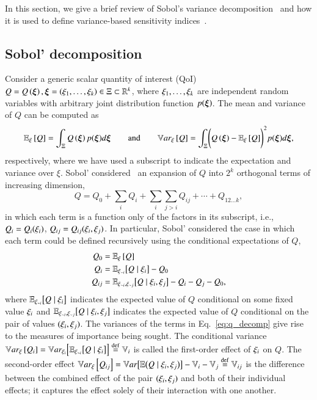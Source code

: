 In this section, we give a brief review of Sobol's variance decomposition~\cite{sobol-1993} and how it is used to define variance-based sensitivity indices~\cite{sobol-1993, homma-saltelli-1996}.

\subsection{Sobol' decomposition}
Consider a generic scalar quantity of interest (QoI) $Q = Q\left( \bm{\xi} \right), \bm{\xi} = \left( \xi_1,\ldots,\xi_k \right) \in \Xi \subset \mathbb{R}^k$, where $\xi_1,\ldots,\xi_k$ are independent random variables with arbitrary joint distribution function $p(\bm{\xi})$. 
The mean and variance of $Q$ can be computed as
\begin{equation}
    \mathbb{E}_\xi\left[Q\right] = \int_{\Xi} Q\left( \bm{\xi} \right) p(\bm{\xi}) d\bm{\xi} \qquad \text{and} \qquad \mathbb{V}ar_{\xi}\left[Q\right] = \int_{\Xi} \Biggl( Q\left( \bm{\xi} \right) - \mathbb{E}_\xi\left[Q\right] \Biggr)^2 p(\bm{\xi}) d\bm{\xi} ,
\end{equation}
respectively, where we have used a subscript to indicate the expectation and variance over $\xi$. 
Sobol' considered~\cite{sobol-1993} an expansion of $Q$ into $2^k$ orthogonal terms of increasing dimension, 
\begin{equation} \label{eq:q_decomp}
    Q = Q_0 + \sum_i Q_i + \sum_i \sum_{j > i} Q_{ij} + \cdots + Q_{12 \ldots k} ,
\end{equation}
in which each term is a function only of the factors in its subscript, i.e., $Q_i = Q_i(\xi_{i})$, $Q_{ij} = Q_{ij}(\xi_{i}, \xi_{j})$.
In particular, Sobol' considered the case in which each term could be defined recursively using the conditional expectations of $Q$,
\begin{align}
    Q_0 &= \mathbb{E}_\xi\left[Q\right] \\
    Q_i &= \mathbb{E}_{\xi_{\sim i}} \bigl[ Q \mid \xi_{i} \bigr] - Q_0 \\
    Q_{ij} &= \mathbb{E}_{\xi_{\sim i},\xi_{\sim j}} \bigl[ Q \mid \xi_{i}, \xi_{j} \bigr] - Q_i - Q_j - Q_0 ,
\end{align}
where $\mathbb{E}_{\xi_{\sim i}} \bigl[ Q \mid \xi_{i} \bigr]$ indicates the expected value of $Q$ conditional on some fixed value $\xi_{i}$ and $\mathbb{E}_{\xi_{\sim i},\xi_{\sim j}} \bigl[ Q \mid \xi_{i}, \xi_{j} \bigr]$ indicates the expected value of $Q$ conditional on the pair of values $(\xi_{i}, \xi_{j})$. 
The variances of the terms in Eq.~\eqref{eq:q_decomp} give rise to the measures of importance being sought. 
The conditional variance $\mathbb{V}ar_{\xi}\left[Q_i\right] = \mathbb{V}ar_{\xi_{i}} \Bigl[ \mathbb{E}_{\xi_{\sim i}}\bigl[ Q \mid \xi_{i} \bigr] \Bigr] \overset{\operatorname{def}}{=} \mathbb{V}_{i}$ is called the first-order effect of $\xi_{i}$ on $Q$.
The second-order effect $\mathbb{V}ar_{\xi}\left[Q_{ij}\right] = \mathbb{V}ar\bigl[ \mathbb{E}\bigl(Q \mid \xi_{i}, \xi_{j}\bigr) \bigr] - \mathbb{V}_{i} - \mathbb{V}_{j} \overset{\operatorname{def}}{=} \mathbb{V}_{ij}$ is the difference between the combined effect of the pair $(\xi_{i},\xi_{j})$ and both of their individual effects; it captures the effect solely of their interaction with one another.
